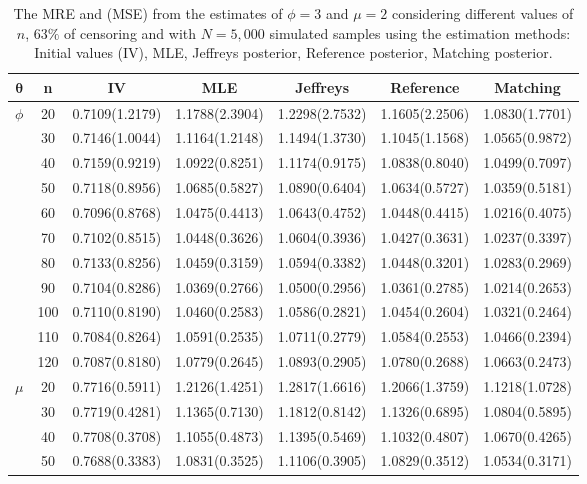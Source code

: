 \documentclass[12pt]{article} %
\theoremstyle{plain}%
\theoremstyle{definition}
\theoremstyle{remark}
\begin{document}
\begin{table}[!h]
\centering
\caption{The MRE and (MSE) from the estimates of $\phi=3$ and $\mu=2$ considering different values of $n$, $63\%$ of censoring and with $N=5,000$ simulated samples using the estimation methods: Initial values (IV),  MLE, Jeffreys posterior, Reference posterior,  Matching posterior.}
{\scriptsize
\begin{tabular}{c|c|c|c|c|c|c}
\hline
$\boldsymbol{\theta}$ & n & IV & MLE & Jeffreys  & Reference  & Matching  \\
\hline
\multirow{11}{*}{$\phi$} 
&  20 & 0.7109(1.2179) & 1.1788(2.3904) & 1.2298(2.7532) & 1.1605(2.2506) & 1.0830(1.7701) \\
&  30 & 0.7146(1.0044) & 1.1164(1.2148) & 1.1494(1.3730) & 1.1045(1.1568) & 1.0565(0.9872) \\
&  40 & 0.7159(0.9219) & 1.0922(0.8251) & 1.1174(0.9175) & 1.0838(0.8040) & 1.0499(0.7097) \\
&  50 & 0.7118(0.8956) & 1.0685(0.5827) & 1.0890(0.6404) & 1.0634(0.5727) & 1.0359(0.5181) \\
&  60 & 0.7096(0.8768) & 1.0475(0.4413) & 1.0643(0.4752) & 1.0448(0.4415) & 1.0216(0.4075) \\
&  70 & 0.7102(0.8515) & 1.0448(0.3626) & 1.0604(0.3936) & 1.0427(0.3631) & 1.0237(0.3397) \\
&  80 & 0.7133(0.8256) & 1.0459(0.3159) & 1.0594(0.3382) & 1.0448(0.3201) & 1.0283(0.2969) \\
&  90 & 0.7104(0.8286) & 1.0369(0.2766) & 1.0500(0.2956) & 1.0361(0.2785) & 1.0214(0.2653) \\
&  100 & 0.7110(0.8190) & 1.0460(0.2583) & 1.0586(0.2821) & 1.0454(0.2604) & 1.0321(0.2464) \\
&  110 & 0.7084(0.8264) & 1.0591(0.2535) & 1.0711(0.2779) & 1.0584(0.2553) & 1.0466(0.2394) \\
&  120 & 0.7087(0.8180) & 1.0779(0.2645) & 1.0893(0.2905) & 1.0780(0.2688) & 1.0663(0.2473) \\
\hline
\multirow{11}{*}{$\mu$} 
&  20 & 0.7716(0.5911) & 1.2126(1.4251) & 1.2817(1.6616) & 1.2066(1.3759) & 1.1218(1.0728) \\
&  30 & 0.7719(0.4281) & 1.1365(0.7130) & 1.1812(0.8142) & 1.1326(0.6895) & 1.0804(0.5895) \\
&  40 & 0.7708(0.3708) & 1.1055(0.4873) & 1.1395(0.5469) & 1.1032(0.4807) & 1.0670(0.4265) \\
&  50 & 0.7688(0.3383) & 1.0831(0.3525) & 1.1106(0.3905) & 1.0829(0.3512) & 1.0534(0.3171) \\

\end{tabular}}
\end{table}
\end{document}
